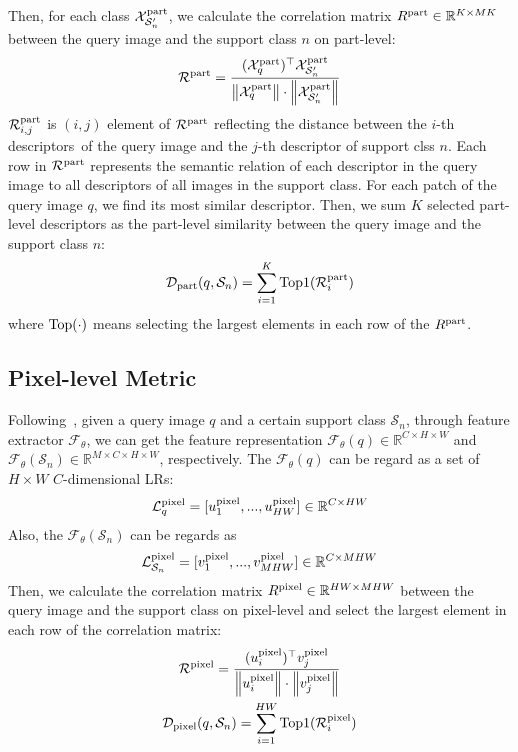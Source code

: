 \documentclass{article}
\begin{document}
Then, for each class $\mathcal{X}^{\rm part}_{\mathcal{S}'_n}$, we calculate the correlation matrix $R^{\rm part}\in\mathbb{R}^{K\times MK}$ between the query image and the support class $n$ on part-level:
\begin{gather}
	\mathcal{R}^{\rm part} = \frac{(\mathcal{X}^{\rm part}_q)^\top\mathcal{X}^{\rm part}_{\mathcal{S}'_n}}
	{
		\left\|\mathcal{X}^{\rm part}_q\right\| \cdot  \left\|\mathcal{X}^{\rm part}_{\mathcal{S}'_n}\right\|} 
\end{gather}
$\mathcal{R}^{\rm part}_{i,j}$ is $(i,j)$ element of $\mathcal{R}^{\rm part}$ reflecting the distance between the $i$-th descriptors\ of the query image and the $j$-th descriptor of support clss $n$. Each row in $\mathcal{R}^{\rm part}$ represents the semantic relation of each descriptor in the query image to all descriptors of all images in the support class.
For each patch of the query image $q$, we find its most similar descriptor. Then, we sum $K$ selected part-level descriptors as the part-level similarity between the query image and the support class $n$:
\begin{equation}
	\mathcal{D}_{\rm part}(q, \mathcal{S}_n)=\sum_{i=1}^{K}{\rm Top1}(\mathcal{R}_{i}^{\rm part} )
\end{equation}
where ${\rm Top}(\cdot)$ means selecting the largest elements in each row of the $R^{\rm part}$.


\subsection{Pixel-level Metric}
Following~\cite{li2019distribution,li2019revisiting,chen2020multi}, given a query image $q$ and a certain support class $\mathcal{S}_n$, through feature extractor $\mathcal{F}_{\theta}$, we can get the feature representation $\mathcal{F}_{\theta}(q)\in\mathbb{R}^{C\times H\times W}$ and $\mathcal{F}_{\theta}(\mathcal{S}_n)\in\mathbb{R}^{M\times C\times H\times W}$, respectively. The $\mathcal{F}_{\theta}(q)$ can be regard as a set of $H\times W$ $C$-dimensional LRs:
\begin{gather}
	\mathcal{L}^{\rm pixel}_{q}=[u^{\rm pixel}_1,...,u^{\rm pixel}_{HW}]\in\mathbb{R}^{C\times HW} 
\end{gather}
Also, the $\mathcal{F}_{\theta}(\mathcal{S}_n)$ can be regards as 
\begin{gather}	
	\mathcal{L}^{\rm pixel}_{\mathcal{S}_n}=[v^{\rm pixel}_1,...,v^{\rm pixel}_{MHW}]\in\mathbb{R}^{C\times MHW} 
\end{gather}
Then, we calculate the correlation matrix $R^{\rm pixel}\in\mathbb{R}^{HW\times MHW}$  between the query image and the support class on pixel-level and select the largest element in each row of the correlation matrix:
\begin{gather}
	\mathcal{R}^{\rm pixel} = \frac{(u^{\rm pixel}_i)^\top v^{\rm pixel}_j}
	{
		\left\|u^{\rm pixel}_i \right\| \cdot  \left\|v^{\rm pixel}_j\right\|} 	
	\\
	\mathcal{D}_{\rm pixel}(q, \mathcal{S}_n)= \sum_{i=1}^{HW} {\rm Top1}(\mathcal{R}_{i}^{\rm pixel} )
\end{gather}
\end{document}

